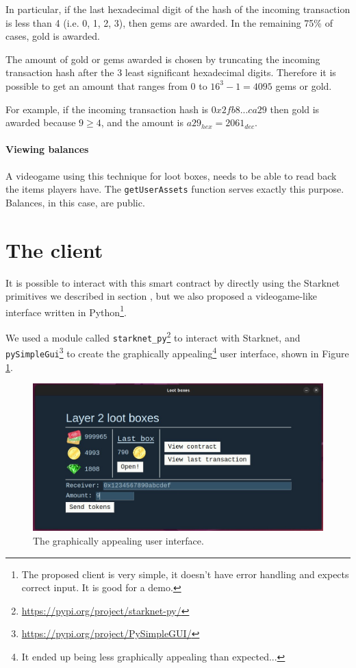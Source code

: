 \documentclass[12pt]{article}
\begin{document}
In particular, if the last hexadecimal digit of the hash of the incoming transaction is less than 4 (i.e. 0, 1, 2, 3), then gems are awarded. In the remaining 75\% of cases, gold is awarded.

The amount of gold or gems awarded is chosen by truncating the incoming transaction hash after the 3 least significant hexadecimal digits. Therefore it is possible to get an amount that ranges from \(0\) to \(16^3 - 1 = 4095\) gems or gold.

For example, if the incoming transaction hash is \(0x2fb8...ca29\) then gold is awarded because \(9 \geq 4\), and the amount is \(a29_{hex} = 2061_{dec}\).

\paragraph{Viewing balances}
A videogame using this technique for loot boxes, needs to be able to read back the items players have. The \verb|getUserAssets| function serves exactly this purpose. Balances, in this case, are public.

\section{The client} \label{section:the_client}
It is possible to interact with this smart contract by directly using the Starknet primitives we described in section , but we also proposed a videogame-like interface written in Python\footnote{The proposed client is very simple, it doesn't have error handling and expects correct input. It is good for a demo.}.

We used a module called \verb|starknet_py|\footnote{\url{https://pypi.org/project/starknet-py/}} to interact with Starknet, and \verb|pySimpleGui|\footnote{\url{https://pypi.org/project/PySimpleGUI/}} to create the graphically appealing\footnote{It ended up being less graphically appealing than expected...} user interface, shown in Figure \ref{figure:client_user_interface}.
\begin{figure}[ht]
    \centering
    \includegraphics[width=\textwidth]{client_user_interface} 
    \caption{The graphically appealing user interface.}
    \label{figure:client_user_interface}
\end{figure}
\end{document}
